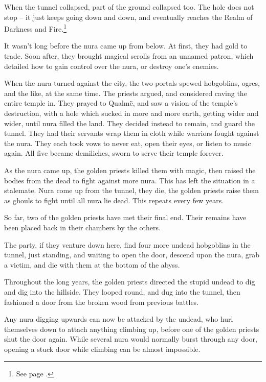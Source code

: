 \begin{multicols}{2}
\begin{exampletext}

When the tunnel collapsed, part of the ground collapsed too.  The hole does not stop -- it just keeps going down and down, and eventually reaches the Realm of Darkness and Fire.\footnote{See page \pageref{darknessandfire}.}

It wasn't long before the nura came up from below.  At first, they had gold to trade.  Soon after, they brought magical scrolls from an unnamed patron, which detailed how to gain control over the nura, or destroy one's enemies.

When the nura turned against the city, the two portals spewed hobgoblins, ogres, and the like, at the same time.
The priests argued, and considered caving the entire temple in.
They prayed to Qualm\"{e}, and saw a vision of the temple's destruction, with a hole which sucked in more and more earth, getting wider and wider, until nura filled the land.
They decided instead to remain, and guard the tunnel.
They had their servants wrap them in cloth while warriors fought against the nura.
They each took vows to never eat, open their eyes, or listen to music again.
All five became demiliches, sworn to serve their temple forever.

As the nura came up, the golden priests killed them with magic, then raised the bodies from the dead to fight against more nura.
This has left the situation in a stalemate.
Nura come up from the tunnel, they die, the golden priests raise them as ghouls to fight until all nura lie dead.
This repeats every few years.

So far, two of the golden priests have met their final end.  Their remains have been placed back in their chambers by the others.

\end{exampletext}


The party, if they venture down here, find four more undead hobgoblins in the tunnel, just standing, and waiting to open the door, descend upon the nura, grab a victim, and die with them at the bottom of the abyss.

\begin{exampletext}

  Throughout the long years, the golden priests directed the stupid undead to dig and dig into the hillside.
  They looped round, and dug into the tunnel, then fashioned a door from the broken wood from previous battles.

Any nura digging upwards can now be attacked by the undead, who hurl themselves down to attach anything climbing up, before one of the golden priests shut the door again.
While several nura would normally burst through any door, opening a stuck door while climbing can be almost impossible.

\end{exampletext}

\end{multicols}


